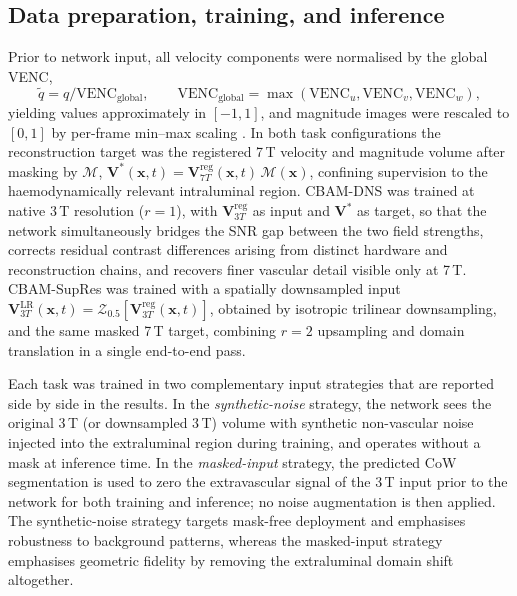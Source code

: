 \documentclass[11pt]{article}
\begin{document}
\subsection*{Data preparation, training, and inference}

Prior to network input, all velocity components were normalised by the
global VENC,
\begin{equation}
    \tilde{q} = q/\mathrm{VENC}_{\text{global}},
    \qquad
    \mathrm{VENC}_{\text{global}}
    = \max(\mathrm{VENC}_u,\mathrm{VENC}_v,\mathrm{VENC}_w),
\end{equation}
yielding values approximately in $[-1,1]$, and magnitude images were
rescaled to $[0,1]$ by per-frame min--max scaling
\cite{cardoso2022monai}. In both task configurations the reconstruction
target was the registered 7\,T velocity and magnitude volume after
masking by $\mathcal{M}$,
$\mathbf{V}^{*}(\mathbf{x},t)=\mathbf{V}^{\text{reg}}_{7T}(\mathbf{x},t)\,
\mathcal{M}(\mathbf{x})$, confining supervision to the haemodynamically
relevant intraluminal region. CBAM-DNS was trained at native 3\,T
resolution ($r=1$), with $\mathbf{V}^{\text{reg}}_{3T}$ as input and
$\mathbf{V}^{*}$ as target, so that the network simultaneously bridges
the SNR gap between the two field strengths, corrects residual contrast
differences arising from distinct hardware and reconstruction chains,
and recovers finer vascular detail visible only at 7\,T. CBAM-SupRes
was trained with a spatially downsampled input
$\mathbf{V}^{\mathrm{LR}}_{3T}(\mathbf{x},t)
 = \mathcal{Z}_{0.5}[\mathbf{V}^{\text{reg}}_{3T}(\mathbf{x},t)]$,
obtained by isotropic trilinear downsampling, and the same masked
7\,T target, combining $r=2$ upsampling and domain translation in a
single end-to-end pass.

Each task was trained in two complementary input strategies that are
reported side by side in the results. In the \emph{synthetic-noise}
strategy, the network sees the original 3\,T (or downsampled 3\,T)
volume with synthetic non-vascular noise injected into the extraluminal
region during training, and operates without a mask at inference time.
In the \emph{masked-input} strategy, the predicted CoW segmentation is
used to zero the extravascular signal of the 3\,T input prior to the
network for both training and inference; no noise augmentation is then
applied. The synthetic-noise strategy targets mask-free deployment and
emphasises robustness to background patterns, whereas the masked-input
strategy emphasises geometric fidelity by removing the extraluminal
domain shift altogether.
\end{document}
